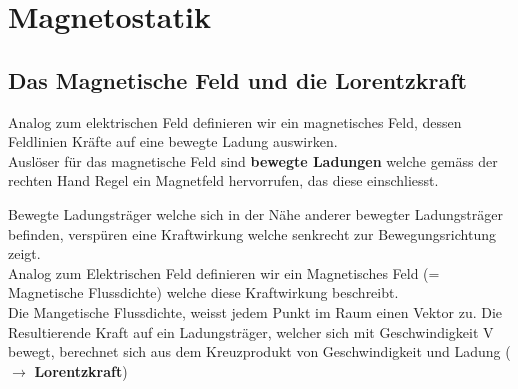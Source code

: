 %
%
%
%
%
\newpage
\section{Magnetostatik}
\subsection{Das Magnetische Feld und die Lorentzkraft}

	Analog zum elektrischen Feld definieren wir ein magnetisches Feld, dessen Feldlinien Kräfte auf eine bewegte Ladung auswirken. \\
	Auslöser für das magnetische Feld sind \textbf{bewegte Ladungen} welche gemäss der rechten Hand Regel ein Magnetfeld hervorrufen, das diese einschliesst. \\
\begin{center}


	\end{center}
	\beginip
	Bewegte Ladungsträger welche sich in der Nähe anderer bewegter Ladungsträger befinden, verspüren eine Kraftwirkung welche senkrecht zur Bewegungsrichtung zeigt. \\
	Analog zum Elektrischen Feld definieren wir ein Magnetisches Feld (= Magnetische Flussdichte) welche diese Kraftwirkung beschreibt. \\
	Die Mangetische Flussdichte, weisst jedem Punkt im Raum einen Vektor zu. Die Resultierende Kraft auf ein Ladungsträger, welcher sich mit Geschwindigkeit V bewegt,
	berechnet sich aus dem Kreuzprodukt von Geschwindigkeit und Ladung ($\rightarrow$ \textbf{Lorentzkraft})
	\iend




